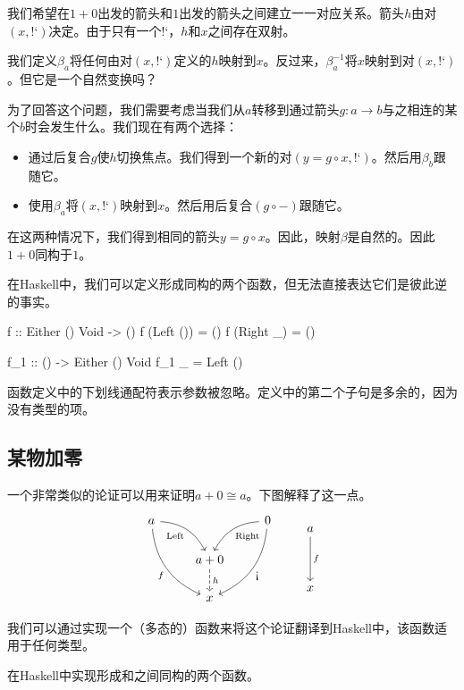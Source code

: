 \documentclass[DaoFP]{subfiles}
\begin{document}
我们希望在$1+0$出发的箭头和$1$出发的箭头之间建立一一对应关系。箭头$h$由对$(x, \mbox{!`})$决定。由于只有一个$\mbox{!`}$，$h$和$x$之间存在双射。

我们定义$\beta_a$将任何由对$(x, \mbox{!`})$定义的$h$映射到$x$。反过来，$\beta^{-1}_a$将$x$映射到对$(x, \mbox{!`})$。但它是一个自然变换吗？

为了回答这个问题，我们需要考虑当我们从$a$转移到通过箭头$g \colon a \to b$与之相连的某个$b$时会发生什么。我们现在有两个选择：
\begin{itemize}
\item 通过后复合$g$使$h$切换焦点。我们得到一个新的对$(y = g \circ x, \mbox{!`})$。然后用$\beta_b$跟随它。
\item 使用$\beta_a$将$(x, \mbox{!`})$映射到$x$。然后用后复合$(g \circ -)$跟随它。
\end{itemize}
在这两种情况下，我们得到相同的箭头$y = g \circ x$。因此，映射$\beta$是自然的。因此$1 + 0$同构于$1$。

在Haskell中，我们可以定义形成同构的两个函数，但无法直接表达它们是彼此逆的事实。
\begin{haskell}
f :: Either () Void -> ()
f (Left ()) = ()
f (Right _) = ()

f_1 :: () -> Either () Void
f_1 _ = Left ()
\end{haskell}
函数定义中的下划线通配符表示参数被忽略。定义中的第二个子句是多余的，因为没有类型的项。

\subsection{某物加零}

一个非常类似的论证可以用来证明$a + 0 \cong a$。下图解释了这一点。
\[
 \begin{tikzcd}
 a
 \arrow[dr,  bend left, "\text{Left}"']
 \arrow[ddr, bend right, "f"']
 && 0
 \arrow[dl, bend right, "\text{Right}"]
 \arrow[ddl, bend left, "\mbox{!`}"]
 \\
&a + 0
\arrow[d, dashed, "h"]
\\
& x
 \end{tikzcd}
 \qquad
 \begin{tikzcd}
 a
 \arrow[dd, "f"]
 \\
 \\
 x
 \end{tikzcd}
\]

我们可以通过实现一个（多态的）函数来将这个论证翻译到Haskell中，该函数适用于任何类型。

\begin{exercise}
在Haskell中实现形成和之间同构的两个函数。
\end{exercise}
\end{document}
